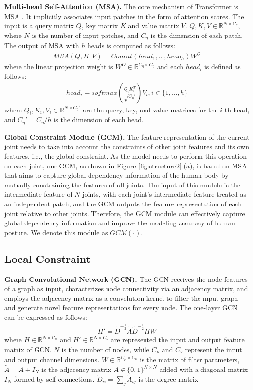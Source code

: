 \documentclass[journal]{IEEEtran}
\begin{document}
{\bf{Multi-head Self-Attention (MSA).}} The core mechanism of Transformer is MSA \cite{vaswani2017attention}. It implicitly associates input patches in the form of attention scores. The input is a query matrix $Q$, key matrix $K$ and value matrix $V$. $Q,K,V \in \mathbb{R}^{N \times C_\eta }$, where $N$ is the number of input patches, and $C_\eta $ is the dimension of each patch. The output of MSA with $h$ heads is computed as follows:
\begin{gather}
\label{eq:msa}
MSA(Q,K,V) = Concat(head_1,...,head_h)W^O
\end{gather}
where the linear projection weight is $W^O \in \mathbb{R}^{C_\eta  \times C_\eta }$ and each $head_i$ is defined as follows:
\begin{gather}
\label{eq:head}
head_i = softmax(\frac{Q_iK_i^T}{\sqrt{C_\eta'}})V_i,i\in \{1,\dots,h\}
\end{gather}
where $Q_i,K_i,V_i \in \mathbb{R}^{N \times C_\eta'}$ are the query, key, and value matrices for the $i$-th head, and $C_\eta'=C_\eta/h$ is the dimension of each head.


{\bf{Global Constraint Module (GCM).}} The feature representation of the current joint needs to take into account the constraints of other joint features and its own features, i.e., the global constraint. As the model needs to perform this operation on each joint, our GCM, as shown in Figure \ref{fig:structure2} (a), is based on MSA that aims to capture global dependency information of the human body by mutually constraining the features of all joints. The input of this module is the intermediate feature of $N$ joints, with each joint's intermediate feature treated as an independent patch, and the GCM outputs the feature representation of each joint relative to other joints. Therefore, the GCM module can effectively capture global dependency information and improve the modeling accuracy of human posture. We denote this module as $GCM(\cdot )$.




\subsection{Local Constraint}
{\bf{Graph Convolutional Network (GCN).}} The GCN receives the node features of a graph as input, characterizes node connectivity via an adjacency matrix, and employs the adjacency matrix as a convolution kernel to filter the input graph and generate novel feature representations for every node. The one-layer GCN can be expressed as follows:
\begin{gather}
\label{eq:gcn}
H' = \widetilde{D} ^{-\frac{1}{2}}\widetilde{A} \widetilde{D} ^{-\frac{1}{2}}HW
\end{gather}
where $H \in \mathbb{R}^{N \times C_\mu }$ and $H' \in \mathbb{R}^{N \times C_\nu }$ are represented the input and output feature matrix of GCN, $N$ is the number of nodes, while $C_\mu $ and $C_\nu $ represent the input and output channel dimensions. $W \in \mathbb{R}^{C_\mu  \times C_\nu }$ is the matrix of filter parameters, $\widetilde{A} = A + I_N$ is the adjacency matrix $A\in \{0,1\}^{N\times N}$ added with a diagonal matrix $I_N$ formed by self-connections. $\widetilde{D}_{ii} = \sum_j \widetilde{A}_{ij}$ is the degree matrix. 
\end{document}
